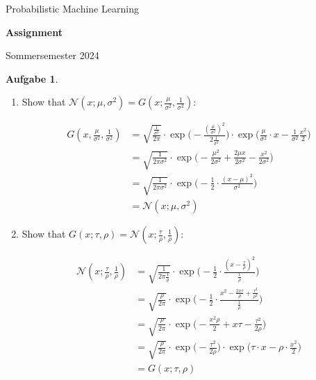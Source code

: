 \documentclass[12pt]{scrartcl}
\newcommand{\makeheader}{
\begin{framed}
	\noindent
	\makeNames \hfill Probabilistic Machine Learning
	\begin{center}
		\Large{\textbf{Assignment \makeSheetNumber}}
	\end{center}
	\hfill Sommersemester 2024
\end{framed}
}
\theoremstyle{definition}
\theoremstyle{exercise}
\newtheorem*{exercise*}{Aufgabe}
\begin{document}
	\thispagestyle{empty}
	\makeheader


	\begin{exercise*}
		\

		\begin{enumerate}
			\item Show that $\mathcal{N}(x;\mu,\sigma^{2})= G(x; \frac{\mu}{\sigma^{2}}
				, \frac{1}{\sigma^{2}})$:

				\begin{align*}
					G(x, \frac{\mu}{\sigma^{2}}, \frac{1}{\sigma^{2}}) & = \sqrt{\frac{\frac{1}{\sigma^{2}}}{2 \pi}}\cdot \exp\Big(- \frac{(\frac{\mu}{\sigma^2})^{2}}{2 \frac{1}{\sigma^{2}}}\Big) \cdot \exp\Big(\frac{\mu}{\sigma^{2}}\cdot x - \frac{1}{\sigma^{2}}\frac{x^{2}}{2}\Big) \\
					                                                   & = \sqrt{\frac{1}{2 \pi \sigma^{2} }}\cdot \exp\Big(- \frac{\mu^{2}}{2\sigma^{2}}+ \frac{2\mu x}{2\sigma^{2}}- \frac{x^{2}}{2 \sigma^{2}}\Big)                                                                      \\
					                                                   & = \sqrt{\frac{1}{2 \pi \sigma^{2} }}\cdot \exp\Big(- \frac{1}{2} \cdot \frac{(x - \mu)^{2}}{\sigma^{2}}\Big)                                                                                                       \\
					                                                   & = \mathcal{N}(x;\mu,\sigma^{2})
				\end{align*}

			\item Show that $G(x; \tau, \rho) = \mathcal{N}(x; \frac{\tau}{\rho},\frac{1}{\rho}
				)$:

				\begin{align*}
					\mathcal{N}(x; \frac{\tau}{\rho},\frac{1}{\rho}) & = \sqrt{\frac{1}{2 \pi \frac{1}{\rho} }}\cdot \exp\Big(- \frac{1}{2} \cdot \frac{(x - \frac{\tau}{\rho})^{2}}{\frac{1}{\rho}}\Big)             \\
					                                                 & = \sqrt{\frac{\rho}{2 \pi}}\cdot \exp\Big(- \frac{1}{2} \cdot \frac{x^{2} - \frac{2 x \tau}{\rho}+ \frac{\tau^2}{\rho^2}}{\frac{1}{\rho}}\Big) \\
					                                                 & = \sqrt{\frac{\rho}{2 \pi}}\cdot \exp\Big(-\frac{x^{2} \rho}{2}+ x \tau - \frac{\tau^{2}}{2\rho}\Big)                                          \\
					                                                 & = \sqrt{\frac{\rho}{2 \pi}}\cdot \exp\Big(-\frac{\tau^{2}}{2\rho}\Big) \cdot \exp\Big(\tau \cdot x -\rho \cdot \frac{x^{2} }{2}\Big)           \\
					                                                 & = G(x; \tau, \rho)
				\end{align*}


\end{enumerate}
\end{exercise*}
\end{document}
